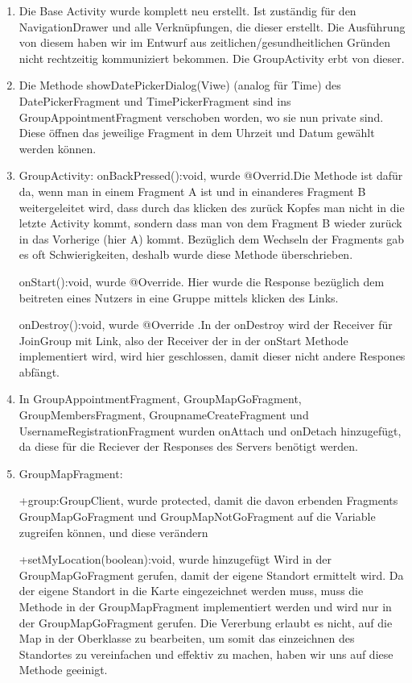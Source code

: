 \begin{enumerate}
	\item Die Base Activity wurde komplett neu erstellt. Ist zuständig für den NavigationDrawer und alle Verknüpfungen, die dieser erstellt. Die Ausführung von diesem haben wir im Entwurf aus zeitlichen/gesundheitlichen Gründen nicht rechtzeitig kommuniziert bekommen. Die GroupActivity erbt von dieser.
	\item Die Methode showDatePickerDialog(Viwe) (analog für Time) des DatePickerFragment und TimePickerFragment sind ins GroupAppointmentFragment verschoben worden, wo sie nun private sind. Diese öffnen das jeweilige Fragment in dem Uhrzeit und Datum gewählt werden können.
	\item GroupActivity: onBackPressed():void, wurde @Overrid.Die Methode ist dafür da, wenn man in einem Fragment A ist und in einanderes Fragment B weitergeleitet wird, dass durch das klicken des zurück Kopfes man nicht in die letzte Activity kommt, sondern dass man von dem Fragment B wieder zurück in das Vorherige (hier A) kommt. Bezüglich dem Wechseln der Fragments gab es oft Schwierigkeiten, deshalb wurde diese Methode überschrieben.

	onStart():void, wurde @Override. Hier wurde die Response bezüglich dem beitreten eines Nutzers in eine Gruppe mittels klicken des Links.

	onDestroy():void, wurde @Override .In der onDestroy wird der Receiver für JoinGroup mit Link, also der Receiver der in der onStart Methode implementiert wird, wird hier geschlossen, damit dieser nicht andere Respones abfängt.
	\item In GroupAppointmentFragment, GroupMapGoFragment, GroupMembersFragment, GroupnameCreateFragment und UsernameRegistrationFragment wurden onAttach und onDetach hinzugefügt, da diese für die Reciever der Responses des Servers benötigt werden.
	\item GroupMapFragment:

	+group:GroupClient, wurde protected, damit die davon erbenden Fragments GroupMapGoFragment und GroupMapNotGoFragment auf die Variable zugreifen können, und diese verändern

	+setMyLocation(boolean):void, wurde hinzugefügt Wird in der GroupMapGoFragment gerufen, damit der eigene Standort ermittelt wird. Da der eigene Standort in die Karte eingezeichnet werden muss, muss die Methode in der GroupMapFragment implementiert werden und wird nur in der GroupMapGoFragment gerufen. Die Vererbung erlaubt es nicht, auf die Map in der Oberklasse zu bearbeiten, um somit das einzeichnen des Standortes zu vereinfachen und effektiv zu machen, haben wir uns auf diese Methode geeinigt.


\end{enumerate}
